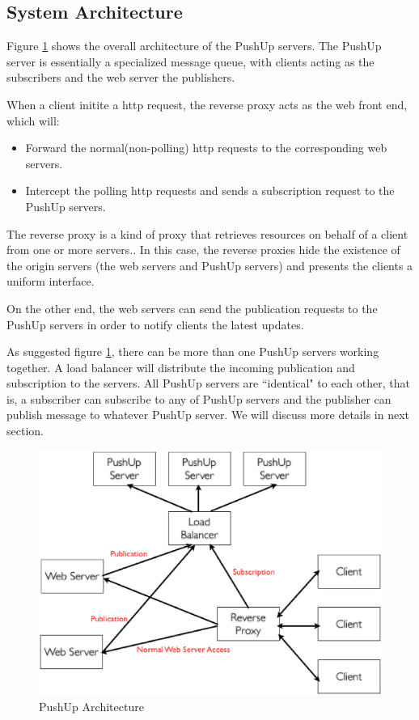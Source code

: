 \subsection{System Architecture\\}

Figure \ref{fig:architecture} shows the overall architecture of the PushUp servers.
The PushUp server is essentially a specialized message queue, with clients 
acting as the subscribers and the web server the publishers.

When a client initite a http request, the reverse proxy acts as the web front end,
which will: 
\begin{itemize}
    \item[1] Forward the normal(non-polling) http requests to the corresponding 
             web servers.
    \item[2] Intercept the polling http requests and sends a subscription request to 
             the PushUp servers.
\end{itemize}

The reverse proxy is a kind of proxy that retrieves
resources on behalf of a client from one or more 
servers.\cite{ReverseProxy}. In this case, the reverse
proxies hide the existence of the origin servers (the 
web servers and PushUp servers) and presents the clients
a uniform interface.

On the other end, the web servers can send the publication requests to the 
PushUp servers in order to notify clients the latest updates.

As suggested figure \ref{fig:architecture}, there can be more than one PushUp 
servers working together. A load balancer will distribute the incoming publication 
and subscription to the servers. All PushUp servers are ``identical" to each other,
that is, a subscriber can subscribe to any of PushUp servers and the publisher can 
publish message to whatever PushUp server. We will discuss more details in next
section.

\begin{figure}[htb!]
\centering%
    \includegraphics[scale=0.30]{figures/pushup.eps}
    \caption{PushUp Architecture}
    \label{fig:architecture}
\end{figure}

